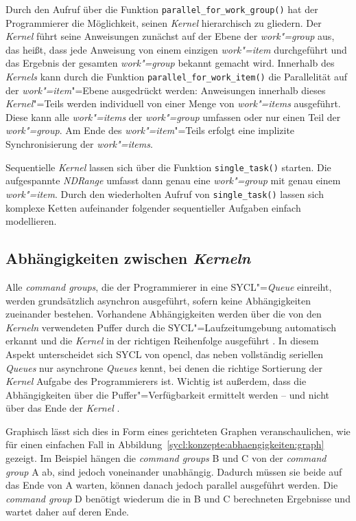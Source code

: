 Durch den Aufruf über die Funktion \texttt{parallel\_for\_work\_group()} hat der
Programmierer die Möglichkeit, seinen \textit{Kernel} hierarchisch zu gliedern. Der
\textit{Kernel} führt seine Anweisungen zunächst auf der Ebene der \textit{work"=group}
aus, das heißt, dass jede Anweisung von einem einzigen \textit{work"=item}
durchgeführt und das Ergebnis der gesamten \textit{work"=group} bekannt gemacht
wird. Innerhalb des \textit{Kernels} kann durch die Funktion
\texttt{parallel\_for\_work\_item()} die Parallelität auf der
\textit{work"=item}"=Ebene ausgedrückt werden: Anweisungen innerhalb dieses
\textit{Kernel}"=Teils werden individuell von einer Menge von \textit{work"=items}
ausgeführt. Diese kann alle \textit{work"=items} der \textit{work"=group}
umfassen oder nur einen Teil der \textit{work"=group}. Am Ende des
\textit{work"=item}"=Teils erfolgt eine implizite Synchronisierung der
\textit{work"=items}.

Sequentielle \textit{Kernel} lassen sich über die Funktion \texttt{single\_task()}
starten. Die aufgespannte \textit{NDRange} umfasst dann genau eine
\textit{work"=group} mit genau einem \textit{work"=item}. Durch den wiederholten
Aufruf von \texttt{single\_task()} lassen sich komplexe Ketten aufeinander
folgender sequentieller Aufgaben einfach modellieren.

\subsection{Abhängigkeiten zwischen \textit{Kerneln}}
\label{sycl:konzepte:abhaengigkeiten}

Alle \textit{command groups}, die der Programmierer in eine
SYCL"=\textit{Queue} einreiht, werden grundsätzlich asynchron ausgeführt, sofern
keine Abhängigkeiten zueinander bestehen. Vorhandene Abhängigkeiten werden über
die von den \textit{Kerneln} verwendeten Puffer durch die SYCL"=Laufzeitumgebung
automatisch erkannt und die \textit{Kernel} in der richtigen Reihenfolge ausgeführt
\cite[vgl.][21--23]{sycl2019}. In diesem Aspekt unterscheidet sich SYCL von
\gls{opencl}, das neben vollständig seriellen \textit{Queues} nur asynchrone
\textit{Queues} kennt, bei denen die richtige Sortierung der \textit{Kernel} Aufgabe des
Programmierers ist. Wichtig ist außerdem, dass die Abhängigkeiten über die
Puffer"=Verfügbarkeit ermittelt werden -- und nicht über das Ende der \textit{Kernel}
\cite[vgl.][166]{sycl2019}.

Graphisch lässt sich dies in Form eines gerichteten Graphen veranschaulichen,
wie für einen einfachen Fall in
Abbildung~\ref{sycl:konzepte:abhaengigkeiten:graph} gezeigt. Im Beispiel hängen
die \textit{command groups} B und C von der \textit{command group} A ab, sind
jedoch voneinander unabhängig. Dadurch müssen sie beide auf das Ende von A
warten, können danach jedoch parallel ausgeführt werden. Die
\textit{command group} D benötigt wiederum die in B und C berechneten
Ergebnisse und wartet daher auf deren Ende.

